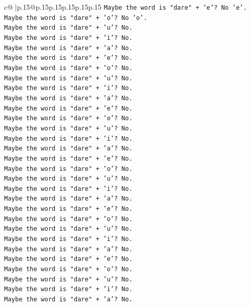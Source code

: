 \documentclass{article}
\begin{document}
{\begin{supertabular}{c@{$\;$}|p{.15\linewidth}@{}p{.15\linewidth}p{.15\linewidth}p{.15\linewidth}p{.15\linewidth}p{.15\linewidth}}
{{{\texttt{Maybe the word is "dare" + 'e'? No 'e'.} \\
\texttt{Maybe the word is "dare" + 'o'? No 'o'.} \\
\texttt{Maybe the word is "dare" + 'u'? No.} \\
\texttt{Maybe the word is "dare" + 'i'? No.} \\
\texttt{Maybe the word is "dare" + 'a'? No.} \\
\texttt{Maybe the word is "dare" + 'e'? No.} \\
\texttt{Maybe the word is "dare" + 'o'? No.} \\
\texttt{Maybe the word is "dare" + 'u'? No.} \\
\texttt{Maybe the word is "dare" + 'i'? No.} \\
\texttt{Maybe the word is "dare" + 'a'? No.} \\
\texttt{Maybe the word is "dare" + 'e'? No.} \\
\texttt{Maybe the word is "dare" + 'o'? No.} \\
\texttt{Maybe the word is "dare" + 'u'? No.} \\
\texttt{Maybe the word is "dare" + 'i'? No.} \\
\texttt{Maybe the word is "dare" + 'a'? No.} \\
\texttt{Maybe the word is "dare" + 'e'? No.} \\
\texttt{Maybe the word is "dare" + 'o'? No.} \\
\texttt{Maybe the word is "dare" + 'u'? No.} \\
\texttt{Maybe the word is "dare" + 'i'? No.} \\
\texttt{Maybe the word is "dare" + 'a'? No.} \\
\texttt{Maybe the word is "dare" + 'e'? No.} \\
\texttt{Maybe the word is "dare" + 'o'? No.} \\
\texttt{Maybe the word is "dare" + 'u'? No.} \\
\texttt{Maybe the word is "dare" + 'i'? No.} \\
\texttt{Maybe the word is "dare" + 'a'? No.} \\
\texttt{Maybe the word is "dare" + 'e'? No.} \\
\texttt{Maybe the word is "dare" + 'o'? No.} \\
\texttt{Maybe the word is "dare" + 'u'? No.} \\
\texttt{Maybe the word is "dare" + 'i'? No.} \\
\texttt{Maybe the word is "dare" + 'a'? No.} \\
}}}
\end{supertabular}}
\end{document}
